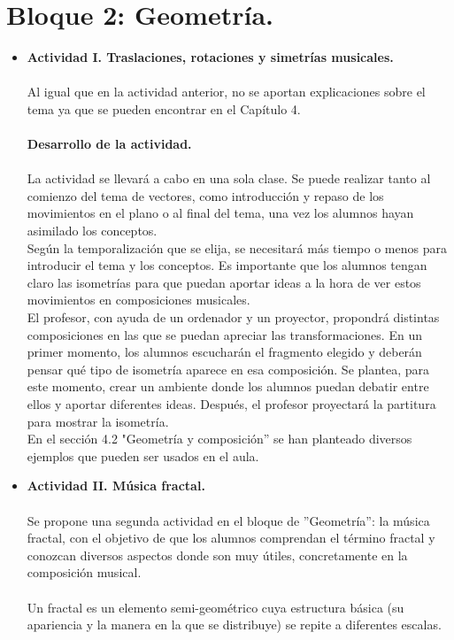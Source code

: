\documentclass[a4paper, openright, 11pt, titlepage]{report}
\theoremstyle{definition}\newtheorem{defin}[propo]{Definition}
\theoremstyle{definition}\newtheorem{obser}[propo]{Remark}
\theoremstyle{definition}\newtheorem{ejem}[propo]{Ejemplo}
\theoremstyle{definition}\newtheorem{algoritmo}[propo]{Algoritmo}
\begin{document}
\section{Bloque 2: Geometría.}
\begin{itemize}
    \item \textbf{Actividad I. Traslaciones, rotaciones y simetrías musicales.}\\\\
    Al igual que en la actividad anterior, no se aportan explicaciones sobre el tema ya que se pueden encontrar en el Capítulo 4.\\\\
    \textbf{Desarrollo de la actividad.}\\\\
    La actividad se llevará a cabo en una sola clase. Se puede realizar tanto al comienzo del tema de vectores, como introducción y repaso de los movimientos en el plano o al final del tema, una vez los alumnos hayan asimilado los conceptos.\\
    Según la temporalización que se elija, se necesitará más tiempo o menos para introducir el tema y los conceptos. Es importante que los alumnos tengan claro las isometrías para que puedan aportar ideas a la hora de ver estos movimientos en composiciones musicales.\\
    El profesor, con ayuda de un ordenador y un proyector, propondrá distintas composiciones en las que se puedan apreciar las transformaciones. En un primer momento, los alumnos escucharán el fragmento elegido y deberán pensar qué tipo de isometría aparece en esa composición. Se plantea, para este momento, crear un ambiente donde los alumnos puedan debatir entre ellos y aportar diferentes ideas. Después, el profesor proyectará la partitura para mostrar la isometría.\\
    En el sección 4.2 "Geometría y composición'' se han planteado diversos ejemplos que pueden ser usados en el aula.
    \item \textbf{Actividad II. Música fractal.}\\\\
    Se propone una segunda actividad en el bloque de ''Geometría'': la música fractal, con el objetivo de que los alumnos comprendan el término fractal y conozcan diversos aspectos donde son muy útiles, concretamente en la composición musical.\\\\
    Un fractal es un elemento semi-geométrico cuya estructura básica (su apariencia y la manera en la que se distribuye) se repite a diferentes escalas.\\

\end{itemize}
\end{document}
